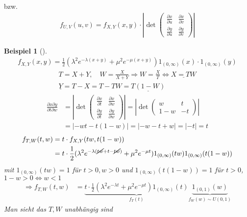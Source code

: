 \documentclass[a4paper,openany]{book}
\theoremstyle{mytheoremstyle}
\newtheorem*{bei}{Beispiel}
\theoremstyle{mytheoremstyle2}
\begin{document}
 bzw. 
 \begin{align*}
    f_{U,V}(u,v)=f_{X,Y}(x,y)\cdot \left|\det \begin{pmatrix}
  \frac{\partial x}{\partial u}&\frac{\partial x}{\partial v}\\\frac{\partial y}{\partial u}&\frac{\partial y}{\partial v}
\end{pmatrix}\right|
 \end{align*}
\begin{bei}[]
  \begin{align*}
    f_{X,Y}(x,y)=\frac{1}{2}(\lambda ^2e^{-\lambda (x+y)}+\mu ^2e^{-\mu (x+y)})1_{(0,\infty )}(x)\cdot 1_{(0,\infty )}(y)
  \end{align*} 
  \begin{align*}
    T=X+Y, \quad W=\frac{X}{X+Y}\Rightarrow W=\frac{X}{T}\Leftrightarrow \underline{X=TW}\\
    \underline{Y}=T-X=T-TW=\underline{T(1-W)}
  \end{align*}
  \begin{align*}
    \frac{\partial x\partial y}{\partial t\partial w}&=
    \left|\det \begin{pmatrix}
      \frac{\partial x}{\partial t}&\frac{\partial x}{\partial w}\\\frac{\partial y}{\partial t}&\frac{\partial y}{\partial w}
    \end{pmatrix}\right|=\left|\det \begin{pmatrix}
        w&t\\1-w&-t
      \end{pmatrix}\right|\\
                                                     &=|-wt-t(1-w)|=|-w-t+w|=|-t|=t
  \end{align*}
  \begin{align*}
    f_{T,W}(t,w)&=t \cdot  f_{X,Y}(tw,t(1-w))\\
                &= t \cdot \frac{1}{2}(\lambda ^2e^{-\lambda (\cancel{tw}+t-\cancel{tw})}+\mu ^2e^{-\mu t})1_{(0,\infty )}(tw)1_{(0,\infty)}(t(1-w))
  \end{align*}
  mit $1 _{(0,\infty )}(tw)=1$ für $t>0,w>0$ und $1 _{(0,\infty )}(t(1-w))=1$ für $t>0$, $1-w>0 \Leftrightarrow w<1$
  \begin{align*}
    \Rightarrow f_{T,W}(t,w)&=\underbrace{t \cdot \frac{1}{2}(\lambda ^2e^{-\lambda t}+\mu ^2e^{-\mu t})1_{(0,\infty )}(t)}_{f_T(t)}\underbrace{1_{(0,1)}(w)}_{f_W(w)\sim U(0,1)}
  \end{align*}
  Man sieht das $T,W$ unabhängig sind 
\end{bei}
\end{document}
